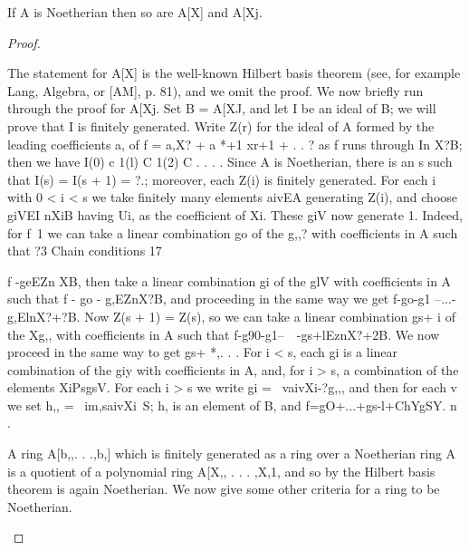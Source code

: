 \begin{theorem}[Theorem 3.3]\label{mcrt-auto-theorem-3-3}\uses{}
\begin{mathematicalrecord}
If A is Noetherian then so are A[X] and A[Xj.
\end{mathematicalrecord}
\end{theorem}
\begin{proof}
\begin{mathematicalrecord}
The statement for A[X] is the well-known Hilbert basis theorem
(see, for example Lang, Algebra, or [AM], p. 81), and we omit the proof.
We now briefly run through the proof for A[Xj.              Set B = A[XJ, and
let I be an ideal of B; we will prove that I is finitely generated. Write
Z(r) for the ideal of A formed by the leading coefficients a, of f = a,X? +
a *+1 xr+1 + . . ? as f runs through In X?B; then we have
          I(0) c 1(l) C 1(2) C . . . .
Since A is Noetherian, there is an s such that I(s) = I(s + 1) = ?.; moreover,
each Z(i) is finitely generated. For each i with 0 < i < s we take finitely many
elements aivEA generating Z(i), and choose giVEI nXiB having Ui, as the
coefficient of Xi. These giV now generate 1. Indeed, for f~1 we can take
a linear combination        go of the g,,? with coefficients in A such that
?3       Chain conditions                                                      17

f -geEZn       XB, then take a linear combination   gi of the glV with
coefficients in A such that f - go - g,EZnX?B,    and proceeding in the
same way we get
           f-go-g1     --...-g,ElnX?+?B.
Now Z(s + 1) = Z(s), so we can take a linear combination       gs+ i of the Xg,,
with coefficients in A such that
        f-g90-g1--~~-gs+lEznX?+2B.
We now proceed in the same way to get gs+ *,. . . For i < s, each gi
is a linear combination        of the giy with coefficients in A, and, for
i > s, a combination      of the elements XiPsgsV. For each i > s we write
gi = ~vaivXi-?g,,,     and then for each v we set h,, = ~im,saivXi~S; h, is an
element of B, and
         f=gO+...+gs-l+ChYgSY.             n .

   A ring A[b,,. . .,b,] which is finitely generated as a ring over a
Noetherian ring A is a quotient of a polynomial ring A[X,, . . . ,X,1, and
so by the Hilbert basis theorem is again Noetherian. We now give some
other criteria for a ring to be Noetherian.
\end{mathematicalrecord}
\end{proof}



